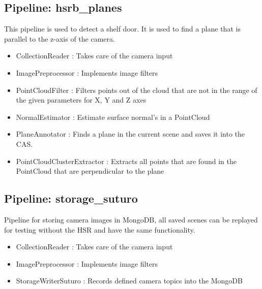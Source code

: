 \documentclass[main.tex]{subfiles}
\begin{document}
			\subsection{Pipeline: hsrb\_planes} 
This pipeline is used to detect a shelf door. It is used to find a plane that is parallel to the z-axis of the camera.
\begin{itemize}
	\item CollectionReader : Takes care of the camera input
	\item ImagePreprocessor : Implements image filters  
	\item PointCloudFilter : Filters points out of the cloud that are not in the range of the given parameters for X, Y and Z axes
	\item NormalEstimator : Estimate surface normal's in a PointCloud 
	\item PlaneAnnotator : Finds a plane in the current scene and saves it into the CAS.
	\item PointCloudClusterExtractor : Extracts all points that are found in the PointCloud that are perpendicular to the plane 
\end{itemize}

			\subsection{Pipeline: storage\_suturo} 
Pipeline for storing camera images in MongoDB, all saved scenes can be replayed for testing without the HSR and have the same functionality. 
\begin{itemize}
	\item CollectionReader : Takes care of the camera input
	\item ImagePreprocessor : Implements image filters 
	\item StorageWriterSuturo :  Records defined camera topics into the MongoDB
\end{itemize}
\end{document}
